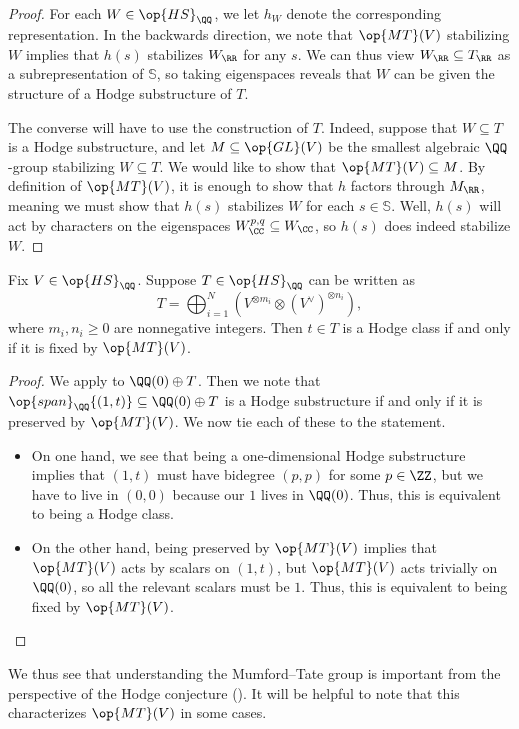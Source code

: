 \documentclass[../thesis.tex]{subfiles}
\begin{document}
\begin{proof}
	For each $W\in\op{HS}_\QQ$, we let $h_W$ denote the corresponding representation. In the backwards direction, we note that $\op{MT}(V)$ stabilizing $W$ implies that $h(s)$ stabilizes $W_\RR$ for any $s$. We can thus view $W_\RR\subseteq T_\RR$ as a subrepresentation of $\mathbb S$, so taking eigenspaces reveals that $W$ can be given the structure of a Hodge substructure of $T$.

	The converse will have to use the construction of $T$. Indeed, suppose that $W\subseteq T$ is a Hodge substructure, and let $M\subseteq\op{GL}(V)$ be the smallest algebraic $\QQ$-group stabilizing $W\subseteq T$. We would like to show that $\op{MT}(V)\subseteq M$. By definition of $\op{MT}(V)$, it is enough to show that $h$ factors through $M_\RR$, meaning we must show that $h(s)$ stabilizes $W$ for each $s\in\mathbb S$. Well, $h(s)$ will act by characters on the eigenspaces $W^{p,q}_\CC\subseteq W_\CC$, so $h(s)$ does indeed stabilize $W$.
\end{proof}
\begin{corollary} \label{cor:hodge-classes-by-mt}
	Fix $V\in\op{HS}_\QQ$. Suppose $T\in\op{HS}_\QQ$ can be written as
	\[T=\bigoplus_{i=1}^N\left(V^{\otimes m_i}\otimes (V^\lor)^{\otimes n_i}\right),\]
	where $m_i,n_i\ge0$ are nonnegative integers. Then $t\in T$ is a Hodge class if and only if it is fixed by $\op{MT}(V)$.
\end{corollary}
\begin{proof}
	We apply  to $\QQ(0)\oplus T$. Then we note that $\op{span}_\QQ\{(1,t)\}\subseteq\QQ(0)\oplus T$ is a Hodge substructure if and only if it is preserved by $\op{MT}(V)$. We now tie each of these to the statement.
	\begin{itemize}
		\item On one hand, we see that being a one-dimensional Hodge substructure implies that $(1,t)$ must have bidegree $(p,p)$ for some $p\in\ZZ$, but we have to live in $(0,0)$ because our $1$ lives in $\QQ(0)$. Thus, this is equivalent to being a Hodge class.
		\item On the other hand, being preserved by $\op{MT}(V)$ implies that $\op{MT}(V)$ acts by scalars on $(1,t)$, but $\op{MT}(V)$ acts trivially on $\QQ(0)$, so all the relevant scalars must be $1$. Thus, this is equivalent to being fixed by $\op{MT}(V)$.
		\qedhere
	\end{itemize}
\end{proof}
We thus see that understanding the Mumford--Tate group is important from the perspective of the Hodge conjecture (). It will be helpful to note that this characterizes $\op{MT}(V)$ in some cases.
\end{document}
